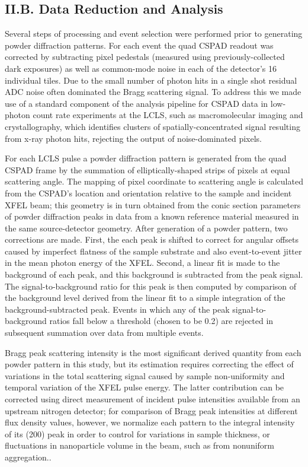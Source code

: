 \subsection{II.B. Data Reduction and Analysis}

Several steps of processing and event selection were performed prior to
generating powder diffraction patterns. For each event the quad CSPAD
readout was corrected by subtracting pixel pedestals (measured using
previously-collected dark exposures) as well as common-mode noise in
each of the detector's 16 individual tiles. \cite{hart2012cspad} Due to the small
number of photon hits in a single shot residual ADC noise often
dominated the Bragg scattering signal. To address this we made use of a
standard component of the analysis pipeline for CSPAD data in low-photon
count rate experiments at the LCLS, such as macromolecular imaging and
crystallography, which identifies clusters of spatially-concentrated
signal resulting from x-ray photon hits, rejecting the output of
noise-dominated pixels. \cite{damiani2016linac}

For each LCLS pulse a powder diffraction pattern is generated from the
quad CSPAD frame by the summation of elliptically-shaped strips of
pixels at equal scattering angle. The mapping of pixel coordinate to
scattering angle is calculated from the CSPAD's location and orientation
relative to the sample and incident XFEL beam; this geometry is in turn
obtained from the conic section parameters of powder diffraction peaks
in data from a known reference material measured in the same
source-detector geometry. After generation of a powder pattern, two
corrections are made. First, the each peak is shifted to correct for
angular offsets caused by imperfect flatness of the sample substrate and
also event-to-event jitter in the mean photon energy of the XFEL.
Second, a linear fit is made to the background of each peak, and this
background is subtracted from the peak signal. The signal-to-background
ratio for this peak is then computed by comparison of the background
level derived from the linear fit to a simple integration of the
background-subtracted peak. Events in which any of the peak
signal-to-background ratios fall below a threshold (chosen to be 0.2)
are rejected in subsequent summation over data from multiple events.

Bragg peak scattering intensity is the most significant derived quantity
from each powder pattern in this study, but its estimation requires
correcting the effect of variations in the total scattering signal
caused by sample non-uniformity and temporal variation of the XFEL pulse
energy. The latter contribution can be corrected using direct
measurement of incident pulse intensities available from an upstream
nitrogen detector; for comparison of Bragg peak intensities at different
flux density values, however, we normalize each pattern to the integral
intensity of its (200) peak in order to control for variations in sample
thickness, or fluctuations in nanoparticle volume in the beam, such as
from nonuniform aggregation..

